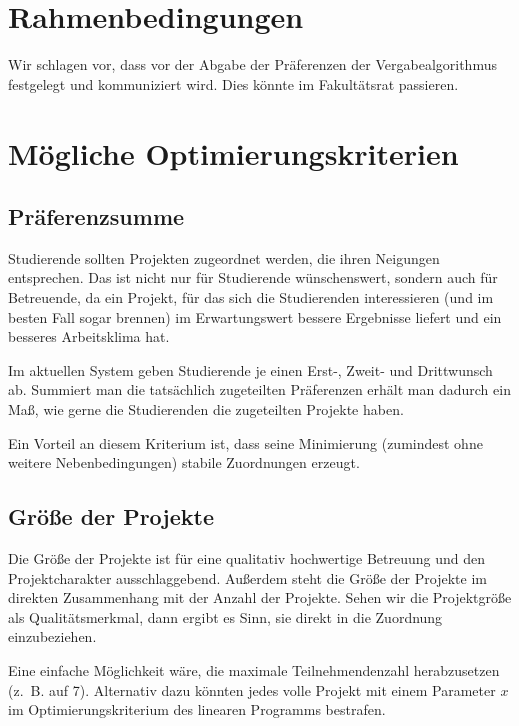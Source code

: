 \documentclass[11pt,a4paper]{article}
\author{Fachschaftsrat \& StudStuKo \\ Ben Bals, Armin Wells, Niko Hastrich}
\date{Mai 2023}
\begin{document}
\maketitle

\section{Rahmenbedingungen}
Wir schlagen vor, dass vor der Abgabe der Präferenzen der Vergabealgorithmus festgelegt und kommuniziert wird. Dies könnte im Fakultätsrat passieren.

\section{Mögliche Optimierungskriterien}
\subsection{Präferenzsumme}
Studierende sollten Projekten zugeordnet werden, die ihren Neigungen entsprechen. Das ist nicht nur für Studierende wünschenswert, sondern auch für Betreuende, da ein Projekt, für das sich die Studierenden interessieren (und im besten Fall sogar brennen) im Erwartungswert bessere Ergebnisse liefert und ein besseres Arbeitsklima hat.

Im aktuellen System geben Studierende je einen Erst-, Zweit- und Drittwunsch ab. Summiert man die tatsächlich zugeteilten Präferenzen erhält man dadurch ein Maß, wie gerne die Studierenden die zugeteilten Projekte haben.

Ein Vorteil an diesem Kriterium ist, dass seine Minimierung (zumindest ohne weitere Nebenbedingungen) stabile Zuordnungen erzeugt. 

\subsection{Größe der Projekte}
Die Größe der Projekte ist für eine qualitativ hochwertige Betreuung und den Projektcharakter ausschlaggebend. Außerdem steht die Größe der Projekte im direkten Zusammenhang mit der Anzahl der Projekte. Sehen wir die Projektgröße als Qualitätsmerkmal, dann ergibt es Sinn, sie direkt in die Zuordnung einzubeziehen.

Eine einfache Möglichkeit wäre, die maximale Teilnehmendenzahl herabzusetzen (z.~B. auf 7). Alternativ dazu könnten jedes volle Projekt mit einem Parameter $x$ im Optimierungskriterium des linearen Programms bestrafen.
\end{document}

